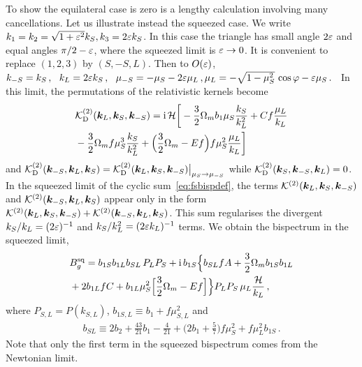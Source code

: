 To show the equilateral case is zero is a lengthy calculation involving many cancellations.  Let us illustrate instead the squeezed case. We write $k_1=k_2=\sqrt{1+\varepsilon^2}k_S, k_3=2\varepsilon k_S$.
In this case the triangle has small angle $2\varepsilon$ and equal angles $\pi/2-\varepsilon$, where the squeezed limit is $\varepsilon\to0$. It is convenient to replace $(1,2,3)$ by $(S,-S,L)$.
Then to $O(\varepsilon)$,
$%
k_{-S}= k_{S}\,,~~k_L=2\ep k_S\,,~~  
\mu_{-S}=-\mu_S-2\ep\mu_L\,,
\mu_L = -\sqrt{1-\mu_S^2}\,\cos\varphi - {\ep\mu_S}\,.
$%
 ~In this limit, the permutations of the relativistic kernels become
\begin{align}
& {\cal K}^{(2)}_{\mathrm{D}}(\bm {k}_L,\bm {k}_S,\bm {k}_{-S}) = \mathrm{i\,} {\mathcal{H}}
{\bigg[- \frac{3}{2}\Omega_m b_1\mu_S \frac{k_S}{k_L^2}+ C f \frac{\mu_L}{k_L} }
\nonumber\\
& - \frac{3}{2} \Omega_m f\mu_S^3 \frac{k_S}{k_L^2} +\Big( \frac{3}{2} \Omega_m- Ef \Big) f\mu_S^2 \frac{\mu_L}{k_L}\bigg] 
\label{k2d1} 
\end{align}
and $ {\cal K}^{(2)}_{\mathrm{D}}(\bm {k}_{-S},\bm {k}_L,\bm {k}_S) =  {\cal K}^{(2)}_{\mathrm{D}}(\bm {k}_L,\bm {k}_S,\bm {k}_{-S})\big|_{\mu_S\to {\mu_{-S}}}$ while ${\cal K}^{(2)}_{\mathrm{D}}(\bm {k}_S,\bm {k}_{-S},\bm {k}_L) =0$. 
In the squeezed limit of the cyclic sum~\eqref{eq:fsbispdef}, the terms $\mathcal{K}^{(2)}(\bm {k}_L,\bm {k}_S,\bm {k}_{-S})$ and $\mathcal{K}^{(2)}(\bm {k}_{-S},\bm {k}_L,\bm {k}_S)$ appear only in the form ${\cal K}^{(2)}(\bm {k}_L,\bm {k}_S,\bm {k}_{-S})+{\cal K}^{(2)}(\bm {k}_{-S},\bm {k}_L,\bm {k}_S)$. This sum regularises the divergent $k_S/k_L=(2\varepsilon)^{-1}$ and $k_S/k_L^2=(2\varepsilon k_L)^{-1}$ terms.  We obtain the bispectrum in the squeezed limit,
\begin{align}
&B_{g}^{\mathrm{sq}} = b_{1S}b_{1L}b_{SL}\, P_LP_S+\mathrm{i\,} b_{1S}\Big\{b_{SL}f A + {\frac{3}{2}} \Omega_m b_{1S}b_{1L} 
\nonumber\\
&+2b_{1L}f C+ b_{1L}\mu_S^2\Big[{\frac{3}{2}}\Omega_m- Ef \Big] \Big\}P_LP_S\,\mu_L \frac{\mathcal{H}}{k_L} \,,\label{bgd}
\end{align}
where $P_{S,L}=P(k_{S,L})$, $b_{1S,L}\equiv  b_1+f\mu_{S,L}^2$ and
\begin{align}
b_{SL} \equiv 2b_2+ \frac{43}{21}b_1 - \frac{4}{21}
+\Big(2b_1+ \frac{5}{7}\Big)f\mu_S^2%
+f\mu_L^2 b_{1S}
\,. \nonumber\label{bsl}
\end{align}
Note that only the first term in the squeezed bispectrum comes from the Newtonian limit. 


